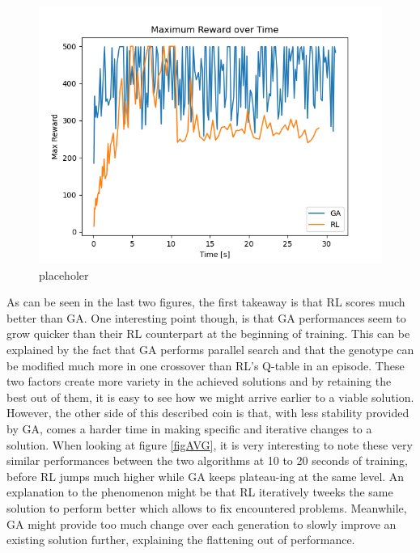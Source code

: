 \begin{figure}[H]
	\centering
	\includegraphics [scale = 0.5]{Images/RL_GA_comparison_max.png}
	\caption{placeholer}
	\label{figMAX}
\end{figure}

As can be seen in the last two figures, the first takeaway is that RL scores much better than GA.
One interesting point though, is that GA performances seem to grow quicker than their RL counterpart at the beginning of training.
This can be explained by the fact that GA performs parallel search and that the genotype can be modified much more in one crossover than RL's Q-table in an episode. 
These two factors create more variety in the achieved solutions and by retaining the best out of them, it is easy to see how we might arrive earlier to a viable solution.
\\
However, the other side of this described coin is that, with less stability provided by GA, comes a harder time in making specific and iterative changes to a solution.
When looking at figure \ref{figAVG}, it is very interesting to note these very similar performances between the two algorithms at 10 to 20 seconds of training, before RL jumps much higher while GA keeps plateau-ing at the same level.
An explanation to the phenomenon might be that RL iteratively tweeks the same solution to perform better which allows to fix encountered problems. Meanwhile, GA might provide too much change over each generation to slowly improve an existing solution further, explaining the flattening out of performance.

